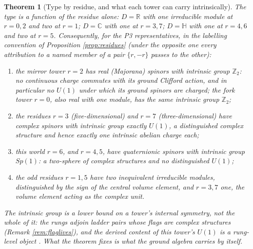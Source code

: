 \documentclass[11pt]{article}
\newtheorem{theorem}{Theorem}[section]
\theoremstyle{definition}
\newcommand{\R}{\mathbb{R}}
\newcommand{\C}{\mathbb{C}}
\begin{document}
\begin{theorem}[Type by residue, and what each tower can carry intrinsically]\label{thm:types}
The type is a function of the residue alone: $D = \R$ with one irreducible module at $r = 0, 2$ and two at $r = 1$; $D = \C$ with one at $r = 3, 7$; $D = \mathbb{H}$ with one at $r = 4, 6$ and two at $r = 5$. Consequently, for the P3 representatives, in the labelling convention of Proposition \ref{prop:residues} (under the opposite one every attribution to a named member of a pair $\{r, -r\}$ passes to the other):
\begin{enumerate}
\item[(i)] the mirror tower $r = 2$ has real (Majorana) spinors with intrinsic group $\mathbb{Z}_{2}$: no continuous charge commutes with its ground Clifford action, and in particular no $U(1)$ under which its ground spinors are charged; the fork tower $r = 0$, also real with one module, has the same intrinsic group $\mathbb{Z}_{2}$;
\item[(ii)] the residues $r = 3$ (five-dimensional) and $r = 7$ (three-dimensional) have complex spinors with intrinsic group exactly $U(1)$, a distinguished complex structure and hence exactly one intrinsic abelian charge each;
\item[(iii)] this world $r = 6$, and $r = 4, 5$, have quaternionic spinors with intrinsic group $Sp(1)$: a two-sphere of complex structures and no distinguished $U(1)$;
\item[(iv)] the odd residues $r = 1, 5$ have two inequivalent irreducible modules, distinguished by the sign of the central volume element, and $r = 3, 7$ one, the volume element acting as the complex unit.
\end{enumerate}
The intrinsic group is a lower bound on a tower's internal symmetry, not the whole of it: the rungs adjoin ladder pairs whose flags are complex structures (Remark \ref{rem:flaglives}), and the derived content of this tower's $U(1)$ is a rung-level object \cite{ButlerT12}. What the theorem fixes is what the ground algebra carries by itself.
\end{theorem}
\end{document}
